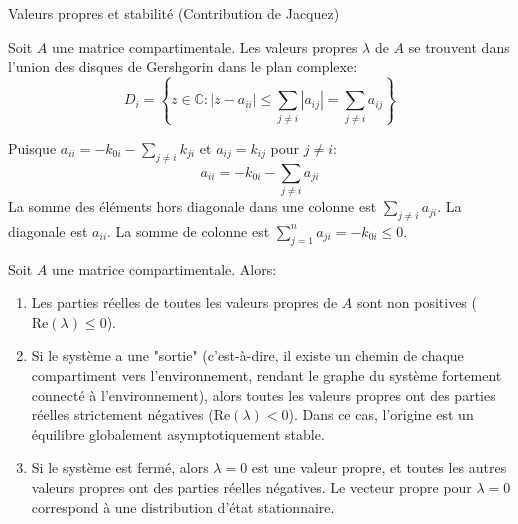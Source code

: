 \documentclass[aspectratio=169]{beamer}\usepackage[]{graphicx}\usepackage[]{xcolor}
\begin{document}
\begin{frame}{Valeurs propres et stabilité (Contribution de Jacquez)}
    \begin{theorem}
        Soit $A$ une matrice compartimentale. Les valeurs propres $\lambda$ de $A$ se trouvent dans l'union des disques de Gershgorin dans le plan complexe:
        $$ D_i = \left\{ z \in \mathbb{C} : |z - a_{ii}| \le \sum_{j \neq i} |a_{ij}| = \sum_{j \neq i} a_{ij} \right\} $$
    \end{theorem}
    Puisque $a_{ii} = -k_{0i} - \sum_{j \neq i} k_{ji}$ et $a_{ij} = k_{ij}$ pour $j \neq i$:
    $$ a_{ii} = -k_{0i} - \sum_{j \neq i} a_{ji} $$
    La somme des éléments hors diagonale dans une colonne est $\sum_{j \neq i} a_{ji}$. La diagonale est $a_{ii}$. La somme de colonne est $\sum_{j=1}^n a_{ji} = -k_{0i} \le 0$.

    \begin{theorem}
        Soit $A$ une matrice compartimentale. Alors:
        \begin{enumerate}
            \item Les parties réelles de toutes les valeurs propres de $A$ sont non positives ($\text{Re}(\lambda) \le 0$).
            \item Si le système a une "sortie" (c'est-à-dire, il existe un chemin de chaque compartiment vers l'environnement, rendant le graphe du système fortement connecté à l'environnement), alors toutes les valeurs propres ont des parties réelles strictement négatives ($\text{Re}(\lambda) < 0$). Dans ce cas, l'origine est un équilibre globalement asymptotiquement stable.
            \item Si le système est fermé, alors $\lambda=0$ est une valeur propre, et toutes les autres valeurs propres ont des parties réelles négatives. Le vecteur propre pour $\lambda=0$ correspond à une distribution d'état stationnaire.
        \end{enumerate}
    \end{theorem}
\end{frame}
\end{document}
